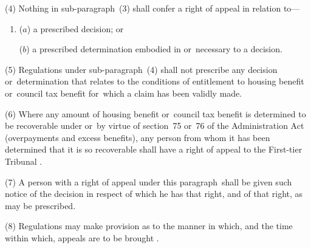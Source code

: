 \documentclass[12pt,a4paper]{article}
\begin{document}
(4) Nothing in sub-paragraph~(3)  shall confer a right of appeal in relation to—
\begin{enumerate}\item[]
($a$) a prescribed decision; or

($b$) a prescribed determination embodied in or~necessary to a decision.
\end{enumerate}

(5) Regulations under sub-paragraph~(4)  shall not prescribe any decision or~determination that relates to the conditions of entitlement to housing benefit or~council tax benefit for~which a claim has been validly made.

%
%
%

(6) Where any amount of housing benefit or~council tax benefit is determined to be recoverable under or~by virtue of section~75 or~76 of the Administration Act (overpayments and excess benefits), any person from whom it has been determined that it is so recoverable shall have a right of appeal to 
the First-tier Tribunal%
.

(7) A person with a right of appeal under this paragraph~shall be given such notice of the decision in respect of which he has that right, and of that right, as may be prescribed.

(8) Regulations may
make provision as to the manner in which, and the time within which, appeals are to be brought%
%
.
\end{document}
